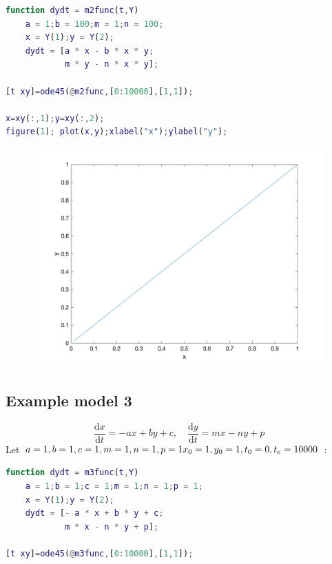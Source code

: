 \documentclass[12pt,a4paper]{article}
\newcommand{\dd}{\mathrm{d}}
\begin{document}
\begin{spacing}{1.5}
\begin{lstlisting}[language=matlab]
function dydt = m2func(t,Y)
    a = 1;b = 100;m = 1;n = 100;
    x = Y(1);y = Y(2);
    dydt = [a * x - b * x * y;
            m * y - n * x * y];

[t xy]=ode45(@m2func,[0:10000],[1,1]);

x=xy(:,1);y=xy(:,2);
figure(1); plot(x,y);xlabel("x");ylabel("y");
\end{lstlisting}
\begin{figure}[htbp]
	\centering
	\includegraphics[scale=0.3]{m2.png}	
\end{figure}

\subsection{Example model 3}
\[
    \frac{\dd x}{\dd t} = - ax + by + c, \quad
    \frac{\dd y}{\dd t} = mx - ny + p
\]
Let $a=1,b=1,c=1,m=1,n=1,p=1 \\ x_0=1, y_0=1, t_0=0, t_e=10000$ :

\begin{lstlisting}[language=matlab]
function dydt = m3func(t,Y)
    a = 1;b = 1;c = 1;m = 1;n = 1;p = 1;
    x = Y(1);y = Y(2);
    dydt = [- a * x + b * y + c;
            m * x - n * y + p];

[t xy]=ode45(@m3func,[0:10000],[1,1]);


\end{lstlisting}
\end{spacing}
\end{document}
